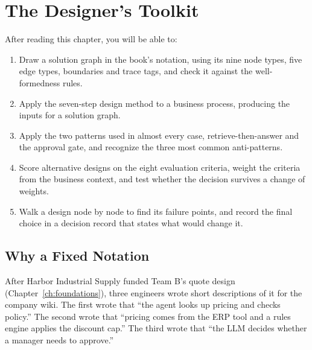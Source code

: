 
\chapter{The Designer's Toolkit}
\label{ch:toolkit}

\begin{objectives}
After reading this chapter, you will be able to:
\begin{enumerate}[leftmargin=*,itemsep=2pt]
  \item Draw a solution graph in the book's notation, using its nine node types, five edge types, boundaries and trace tags, and check it against the well-formedness rules.
  \item Apply the seven-step design method to a business process, producing the inputs for a solution graph.
  \item Apply the two patterns used in almost every case, retrieve-then-answer and the approval gate, and recognize the three most common anti-patterns.
  \item Score alternative designs on the eight evaluation criteria, weight the criteria from the business context, and test whether the decision survives a change of weights.
  \item Walk a design node by node to find its failure points, and record the final choice in a decision record that states what would change it.
\end{enumerate}
\end{objectives}

\section{Why a Fixed Notation}
\label{sec:why-notation}

After Harbor Industrial Supply funded Team B's quote design (Chapter~\ref{ch:foundations}), three engineers wrote short descriptions of it for the company wiki. The first wrote that ``the agent looks up pricing and checks policy.'' The second wrote that ``pricing comes from the ERP tool and a rules engine applies the discount cap.'' The third wrote that ``the LLM decides whether a manager needs to approve.''


